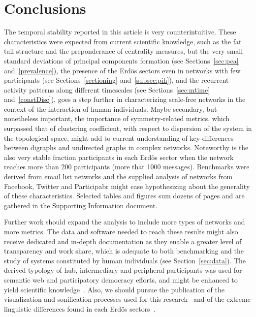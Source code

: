 \documentclass[%
	aip,
	jmp,%
	amsmath,amssymb,
	reprint,%
]{revtex4-1}
\begin{document}
\section{Conclusions}\label{sec:conc}
The temporal stability reported in this article is very counterintuitive.
These characteristics were expected from current scientific knowledge,
such as the fat tail structure and the preponderance of centrality measures,
but the very small standard deviations of principal components formation
(see Sections~\ref{sec:pca} and~\ref{prevalence}),
the presence of the Erd\"os sectors even in networks with
few participants (see Sections~\ref{sectioning} and~\ref{subsec:pih}),
and the recurrent activity patterns along different timescales (see Sections~\ref{sec:mtime} and~\ref{constDisc}),
goes a step further in characterizing scale-free networks in the context
of the interaction of human individuals.
Maybe secondary, but nonetheless important, the importance of symmetry-related metrics,
which surpassed that of clustering coefficient,
with respect to dispersion of the system in the topological space,
might add to current understanding of key-differences between digraphs and
undirected graphs in complex networks.
Noteworthy is the also very stable fraction participants in each Erd\"os sector
when the network reaches more than 200 participants (more that 1000 messages).
Benchmarks were derived from email list networks
and the supplied analysis of
networks from Facebook,
Twitter and Participabr might ease hypothesizing
about the generality of these characteristics.
Selected tables and figures sum dozens of pages
and are gathered in
the Supporting Information document.

Further work should expand the analysis to include
more types of networks and more metrics.
The data and software needed to reach these results
might also receive dedicated and in-depth
documentation as they enable a greater level of transparency
and work share,
which is adequate to both benchmarking
and the study of systems constituted
by human individuals (see Section~\ref{sec:data}).
The derived typology of hub, intermediary and peripheral participants
was used for semantic web and participatory democracy efforts,
and might be enhanced to yield scientific knowledge~\cite{opa}.
Also, we should pursue the publication of the visualization and sonification
processes used for this research~\cite{versinus,animacoes} and
of the extreme linguistic differences found in each Erd\"os sectors~\cite{rcText}.


% 
% 
\end{document}
